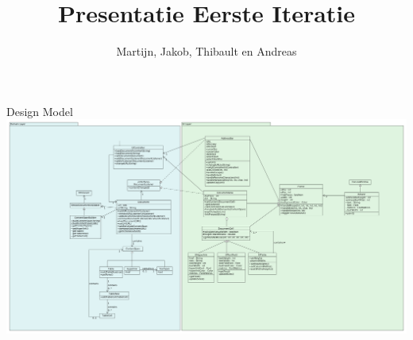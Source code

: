 \documentclass{beamer}
\title{Presentatie Eerste Iteratie}
\author{Martijn, Jakob, Thibault en Andreas}
\begin{document}
\begin{frame}[plain]
    \maketitle
\end{frame}
\begin{frame}{Design Model}
	\centering
	\includegraphics[scale=0.15]{../../Diagrams/UpdatedDesignModel.png}
\end{frame}
\begin{frame}
	
\end{frame}
\end{document}

